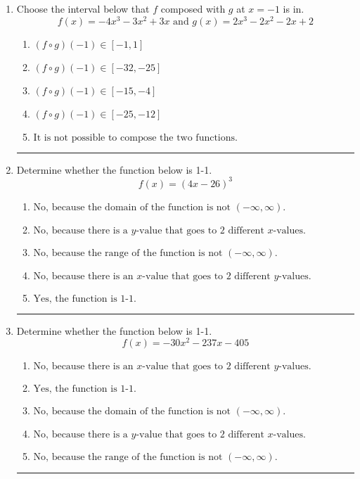 \documentclass[14pt]{extbook}
\newcommand{\litem}[1]{\item#1\hspace*{-1cm}\rule{\textwidth}{0.4pt}}
\begin{document}
\begin{enumerate}
\litem{
Choose the interval below that $f$ composed with $g$ at $x=-1$ is in.\[ f(x) = -4x^{3} -3 x^{2} +3 x \text{ and } g(x) = 2x^{3} -2 x^{2} -2 x + 2 \]\begin{enumerate}[label=\Alph*.]
\item \( (f \circ g)(-1) \in [-1, 1] \)
\item \( (f \circ g)(-1) \in [-32, -25] \)
\item \( (f \circ g)(-1) \in [-15, -4] \)
\item \( (f \circ g)(-1) \in [-25, -12] \)
\item \( \text{It is not possible to compose the two functions.} \)

\end{enumerate} }
\litem{
Determine whether the function below is 1-1.\[ f(x) = (4 x - 26)^3 \]\begin{enumerate}[label=\Alph*.]
\item \( \text{No, because the domain of the function is not $(-\infty, \infty)$.} \)
\item \( \text{No, because there is a $y$-value that goes to 2 different $x$-values.} \)
\item \( \text{No, because the range of the function is not $(-\infty, \infty)$.} \)
\item \( \text{No, because there is an $x$-value that goes to 2 different $y$-values.} \)
\item \( \text{Yes, the function is 1-1.} \)

\end{enumerate} }
\litem{
Determine whether the function below is 1-1.\[ f(x) = -30 x^2 - 237 x - 405 \]\begin{enumerate}[label=\Alph*.]
\item \( \text{No, because there is an $x$-value that goes to 2 different $y$-values.} \)
\item \( \text{Yes, the function is 1-1.} \)
\item \( \text{No, because the domain of the function is not $(-\infty, \infty)$.} \)
\item \( \text{No, because there is a $y$-value that goes to 2 different $x$-values.} \)
\item \( \text{No, because the range of the function is not $(-\infty, \infty)$.} \)


\end{enumerate}}
\end{enumerate}
\end{document}

